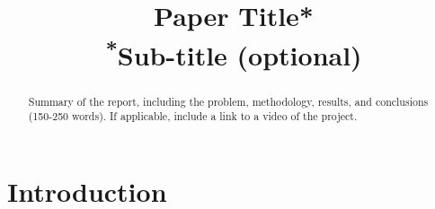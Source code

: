 \documentclass[conference]{IEEEtran}
\begin{document}
\title{Paper Title*\\
{\footnotesize \textsuperscript{*}Sub-title (optional)}
}

\author{
\and
{}
\and
{}
\and
{}
\and
{}
\and
{}
}

\maketitle

\begin{abstract}
Summary of the report, including the problem, methodology, results, and conclusions (150-250 words). If applicable, include a link to a video of the project.
\end{abstract}

\section{Introduction}
\end{document}
